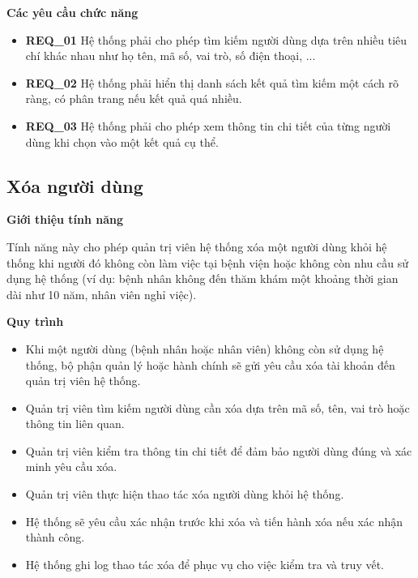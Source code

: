 \noindent \textbf{Các yêu cầu chức năng}

\begin{itemize}

    \item \textbf{REQ\_01} Hệ thống phải cho phép tìm kiếm người dùng dựa trên nhiều tiêu chí khác nhau như họ tên, mã số, vai trò, số điện thoại, ...

    \item \textbf{REQ\_02} Hệ thống phải hiển thị danh sách kết quả tìm kiếm một cách rõ ràng, có phân trang nếu kết quả quá nhiều.

    \item \textbf{REQ\_03} Hệ thống phải cho phép xem thông tin chi tiết của từng người dùng khi chọn vào một kết quả cụ thể.

\end{itemize}

\subsection{Xóa người dùng}

\noindent \textbf{Giới thiệu tính năng}

Tính năng này cho phép quản trị viên hệ thống xóa một người dùng khỏi hệ thống khi người đó không còn làm việc tại bệnh viện hoặc không còn nhu cầu sử dụng hệ thống (ví dụ: bệnh nhân không đến thăm khám một khoảng thời gian dài như 10 năm, nhân viên nghỉ việc).

\noindent \textbf{Quy trình}

\begin{itemize}

    \item Khi một người dùng (bệnh nhân hoặc nhân viên) không còn sử dụng hệ thống, bộ phận quản lý hoặc hành chính sẽ gửi yêu cầu xóa tài khoản đến quản trị viên hệ thống.

    \item Quản trị viên tìm kiếm người dùng cần xóa dựa trên mã số, tên, vai trò hoặc thông tin liên quan.

    \item Quản trị viên kiểm tra thông tin chi tiết để đảm bảo người dùng đúng và xác minh yêu cầu xóa.

    \item Quản trị viên thực hiện thao tác xóa người dùng khỏi hệ thống.

    \item Hệ thống sẽ yêu cầu xác nhận trước khi xóa và tiến hành xóa nếu xác nhận thành công.

    \item Hệ thống ghi log thao tác xóa để phục vụ cho việc kiểm tra và truy vết.

\end{itemize}

